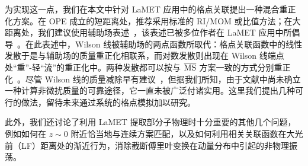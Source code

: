 为实现这一点，我们在本文中针对 LaMET 应用中的格点关联提出一种混合重正化方案。在 OPE 成立的短距离处，推荐采用标准的 RI/MOM 或比值方法；在大距离处，我们建议使用辅助场表述~\cite{Samuel:1978iy,Gervais:1979fv,Arefeva:1980zd,Dorn:1986dt}，该表述已被多位作者在 LaMET 应用中所倡导~\cite{Ji:2017oey,Green:2017xeu,Green:2020xco}。在此表述中，Wilson 线被辅助场的两点函数所取代：格点关联函数中的线性发散于是与辅助场的质量重正化相联系，而对数发散则出现在 Wilson 线端点处``重''-轻``流''的重正化中。两种发散都可以按与 $\overline{\rm MS}$ 方案一致的方式分别重正化~\cite{Green:2017xeu,
Green:2020xco}。尽管 Wilson 线的质量减除早有建议~\cite{Chen:2016fxx,Ishikawa:2017faj}，但据我们所知，由于文献中尚未确立一种计算非微扰质量的可靠途径，它一直未被广泛付诸实用。这里我们提出几种可行的做法，留待未来通过系统的格点模拟加以研究。

此外，我们还讨论了利用 LaMET 提取部分子物理时十分重要的其他几个问题，例如如何在 $z\sim 0$ 附近恰当地与连续方案匹配，以及如何利用相关关联函数在大光前（LF）距离处的渐近行为，消除截断傅里叶变换在动量分布中引起的非物理振荡。
